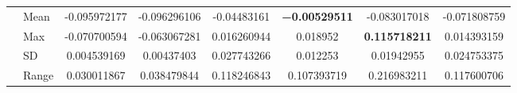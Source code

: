 \documentclass{article}
\begin{document}
\begin{table}[tbp]
{\begin{tabular}{
|l|l|
S[table-format=2.4]
S[table-format=2.4]
S[table-format=2.4]
S[table-format=2.4]
S[table-format=2.4]
S[table-format=2.4]|
}
\Xhline{3\arrayrulewidth}
& Mean  & -0.095972177 & -0.096296106 & -0.04483161 & {\bfseries\num{-0.00529511}} & -0.083017018 & -0.071808759 \\
& Max   & -0.070700594 & -0.063067281 & 0.016260944 & 0.018952 & {\bfseries\num{0.115718211}} & 0.014393159 \\
& SD    & 0.004539169 & 0.00437403 & 0.027743266 & 0.012253 & 0.01942955 & 0.024753375 \\
& Range & 0.030011867 & 0.038479844 & 0.118246843 & 0.107393719 & 0.216983211 & 0.117600706 \\
\hline
\end{tabular}}
\label{tab:alg_analysis}
\vspace{-10pt}
\end{table}
\end{document}
